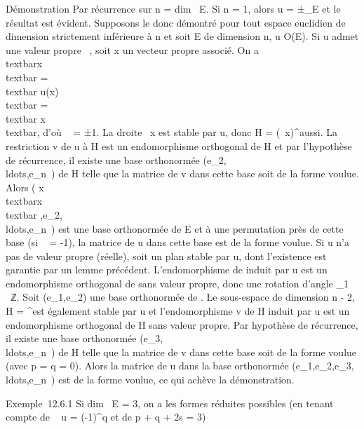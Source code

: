 \documentclass[]{article}
\begin{document}
Démonstration Par récurrence sur n = dim~ E. Si
n = 1, alors u = ±\mathrmId\_E et le résultat
est évident. Supposons le donc démontré pour tout espace euclidien de
dimension strictement inférieure à n et soit E de dimension n, u \in O(E).
Si u admet une valeur propre \lambda~, soit x un vecteur propre associé. On a
\textbar{}\lambda~\textbar{}\\textbar{}x\\textbar{}
=\\textbar{} u(x)\\textbar{}
=\\textbar{} x\\textbar{}, d'où \lambda~ = ±1. La
droite ~x est stable par u, donc H = (~x)^\bot aussi. La
restriction v de u à H est un endomorphisme orthogonal de H et par
l'hypothèse de récurrence, il existe une base orthonormée
(e\_2,\\ldots,e\_n~)
de H telle que la matrice de v dans cette base soit de la forme voulue.
Alors ( x \over
\\textbar{}x\\textbar{}
,e\_2,\\ldots,e\_n~)
est une base orthonormée de E et à une permutation près de cette base
(si \lambda~ = -1), la matrice de u dans cette base est de la forme voulue. Si
u n'a pas de valeur propre (réelle), soit \Pi un plan stable par u, dont
l'existence est garantie par un lemme précédent. L'endomorphisme de \Pi
induit par u est un endomorphisme orthogonal de \Pi sans valeur propre,
donc une rotation d'angle \theta\_1 \in {}~ \diagdown \pi~ℤ. Soit
(e\_1,e\_2) une base orthonormée de \Pi. Le sous-espace de
dimension n - 2, H = \Pi^\bot est également stable par u et
l'endomorphisme v de H induit par u est un endomorphisme orthogonal de H
sans valeur propre. Par hypothèse de récurrence, il existe une base
orthonormée
(e\_3,\\ldots,e\_n~)
de H telle que la matrice de v dans cette base soit de la forme voulue
(avec p = q = 0). Alors la matrice de u dans la base orthonormée
(e\_1,e\_2,e\_3,\\ldots,e\_n~)
est de la forme voulue, ce qui achève la démonstration.

Exemple~12.6.1 Si dim~ E = 3, on a les formes
réduites possibles (en tenant compte de
~ u =
(-1)^q et de p + q + 2s = 3)
\end{document}
